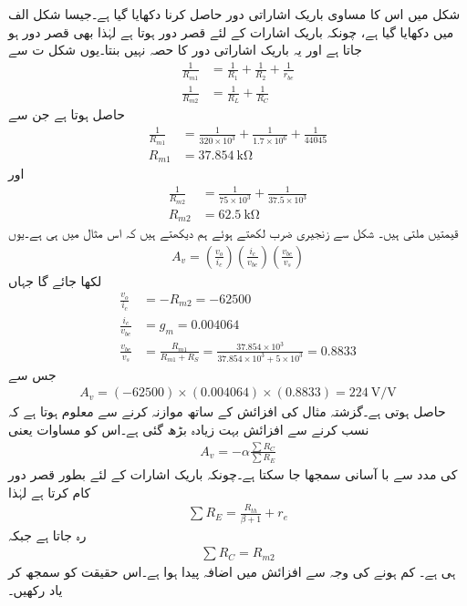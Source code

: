 شکل   میں اس کا مساوی باریک اشاراتی دور حاصل کرنا دکھایا گیا ہے۔جیسا شکل  الف میں دکھایا گیا ہے، چونکہ  باریک اشارات کے لئے قصر دور ہوتا ہے لہٰذا   بھی قصر دور ہو جاتا ہے اور یہ باریک اشاراتی دور کا حصہ نہیں بنتا۔یوں شکل  ت سے
\begin{align*}
\frac{1}{R_{m1}}&=\frac{1}{R_1}+\frac{1}{R_2}+\frac{1}{r_{be}}\\
\frac{1}{R_{m2}}&=\frac{1}{R_L}+\frac{1}{R_C}
\end{align*}
حاصل ہوتا ہے جن سے
\begin{align*}
\frac{1}{R_{m1}}&=\frac{1}{320 \times 10^3}+\frac{1}{1.7 \times 10^6}+\frac{1}{44045}\\
R_{m1}&=\SI{37.854}{\kilo \ohm}
\end{align*}
اور
\begin{align*}
\frac{1}{R_{m2}}&=\frac{1}{75 \times 10^3}+\frac{1}{37.5 \times 10^3}\\
R_{m2}&=\SI{62.5}{\kilo \ohm}
\end{align*}
قیمتیں ملتی ہیں۔
شکل سے زنجیری ضرب لکھتے ہوئے ہم دیکھتے ہیں کہ اس مثال میں  ہی  ہے۔یوں
\begin{align*}
A_v=\left(\frac{v_o}{i_c} \right ) \left(\frac{i_c}{v_{be}} \right ) \left(\frac{v_{be}}{v_s} \right )
\end{align*}
لکھا جائے گا جہاں
\begin{align*}
\frac{v_o}{i_c}&=-R_{m2}=\num{-62500}\\
\frac{i_c}{v_{be}}&=g_m =\num{0.004064}\\
\frac{v_{be}}{v_s}&=\frac{R_{m1}}{R_{m1}+R_S}=\frac{37.854 \times 10^3}{37.854 \times 10^3+5 \times 10^3}=\num{0.8833}
\end{align*}
جس سے
\begin{align*}
A_v=(-62500) \times (0.004064) \times (0.8833)=\SI[per=frac,fraction=nice]{224}{\volt \per \volt}
\end{align*}
حاصل ہوتی ہے۔گزشتہ مثال کی افزائش کے ساتھ موازنہ کرنے سے معلوم ہوتا ہے کہ    نسب کرنے سے افزائش بہت زیادہ بڑھ گئی ہے۔اس کو مساوات   یعنی
\begin{align*}
A_v = -\alpha \frac{\sum R_C}{\sum R_E}
\end{align*}
کی مدد سے با آسانی سمجھا جا سکتا ہے۔چونکہ باریک اشارات کے لئے  بطور قصر دور کام کرتا ہے لہٰذا
\begin{align*}
\sum{R_E}=\frac{R_{th}}{\beta+1}+r_e
\end{align*}
رہ جاتا ہے جبکہ
\begin{align*}
\sum{R_C}=R_{m2}
\end{align*} 
ہی ہے۔  کم ہونے کی وجہ سے افزائش میں اضافہ پیدا ہوا ہے۔اس حقیقت کو سمجھ کر یاد رکھیں۔

